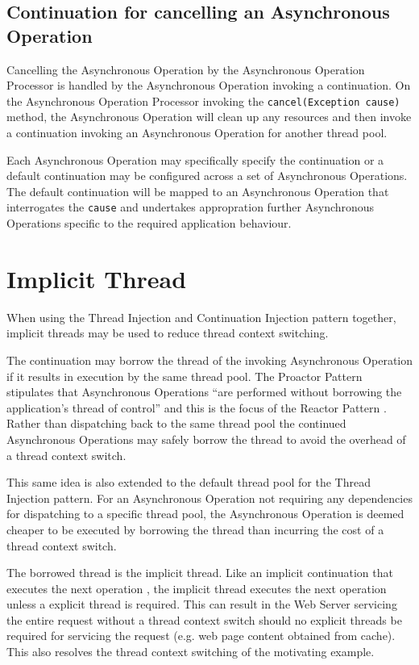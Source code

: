 \documentclass{article}
\begin{document}
\subsection{Continuation for cancelling an Asynchronous Operation}

Cancelling the Asynchronous Operation by the Asynchronous Operation Processor is
handled by the Asynchronous Operation invoking a continuation.  On the
Asynchronous Operation Processor invoking the \texttt{cancel(Exception cause)}
method, the Asynchronous Operation will clean up any resources and then invoke a
continuation invoking an Asynchronous Operation for another thread pool.

Each Asynchronous Operation may specifically specify the continuation or a
default continuation may be configured across a set of Asynchronous Operations. 
The default continuation will be mapped to an Asynchronous Operation that
interrogates the \texttt{cause} and undertakes appropration further Asynchronous
Operations specific to the required application behaviour.


\section{Implicit Thread}

When using the Thread Injection and Continuation Injection pattern together,
implicit threads may be used to reduce thread context switching.

The continuation may borrow the thread of the invoking Asynchronous Operation if
it results in execution by the same thread pool.  The Proactor Pattern
stipulates that Asynchronous Operations ``are performed without borrowing the
application's thread of control'' \cite{proactor} and this is the focus of the
Reactor Pattern \cite{reactor}.  Rather than dispatching back to the same thread
pool the continued Asynchronous Operations may safely borrow the thread to avoid
the overhead of a thread context switch.

This same idea is also extended to the default thread pool for the Thread
Injection pattern.  For an Asynchronous Operation not requiring any dependencies
for dispatching to a specific thread pool, the Asynchronous Operation is deemed
cheaper to be executed by borrowing the thread than incurring the cost of a
thread context switch.

The borrowed thread is the implicit thread.  Like an implicit continuation that
executes the next operation \cite{continuations}, the implicit thread executes
the next operation unless a explicit thread is required.  This can result in the
Web Server servicing the entire request without a thread context switch should
no explicit threads be required for servicing the request (e.g. web page content
obtained from cache).  This also resolves the thread context switching of the
motivating example.
\end{document}
